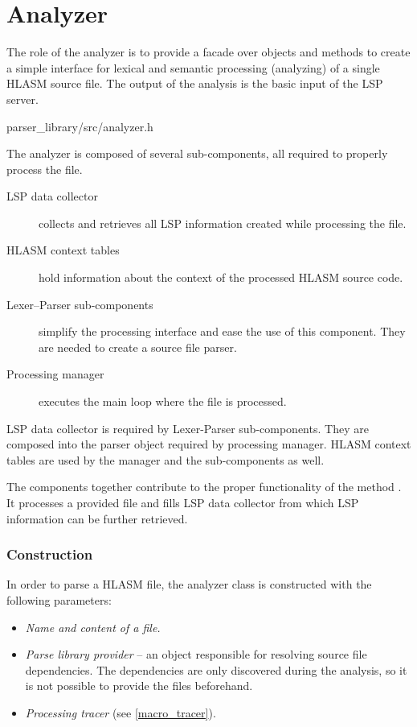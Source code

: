 \chapter {Analyzer}
\label{chap:analyzer}

The role of the analyzer is to provide a facade over objects and methods to create a simple interface for lexical and semantic processing (analyzing) of a single HLASM source file. The output of the analysis is the basic input of the LSP server.

{parser\_library/src/analyzer.h}

The analyzer is composed of several sub-components, all required to properly process the file. 
\begin{description}
	\item[LSP data collector] collects and retrieves all LSP information created while processing the file.
	\item[HLASM context tables] hold information about the context of the processed HLASM source code.
	\item[Lexer--Parser sub-components] simplify the processing interface and ease the use of this component. They are needed to create a source file parser.
	\item[Processing manager] executes the main loop where the file is processed.
\end{description}

LSP data collector is required by Lexer-Parser sub-components. They are composed into the parser object required by processing manager. HLASM context tables are used by the manager and the sub-components as well. 

The components together contribute to the proper functionality of the method . It processes a provided file and fills LSP data collector from which LSP information can be further retrieved.  

\subsection{Construction}

In order to parse a HLASM file, the analyzer class is constructed with the following parameters:
\begin{itemize}
	\item \emph{Name and content of a file.}
	\item \emph{Parse library provider} -- an object responsible for resolving source file dependencies. The dependencies are only discovered during the analysis, so it is not possible to provide the files beforehand.
	\item \emph{Processing tracer} (see \cref{macro_tracer}).
\end{itemize}

